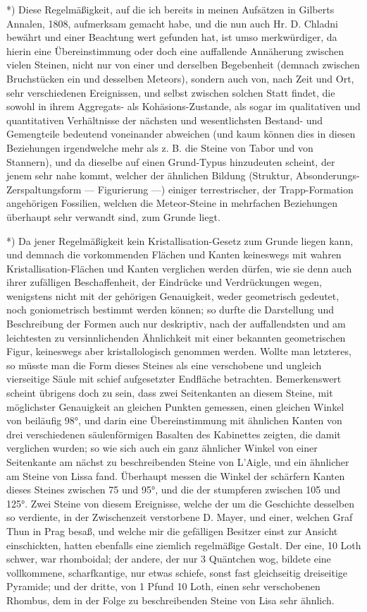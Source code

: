 \documentclass[a4paper, 11pt, oneside, german]{article}
\begin{document}
*) Diese Regelmäßigkeit, auf die ich bereits in meinen Aufsätzen in Gilberts Annalen, 1808, aufmerksam gemacht habe, und die nun auch Hr. D. Chladni bewährt und einer Beachtung wert gefunden hat, ist umso merkwürdiger, da hierin eine Übereinstimmung oder doch eine auffallende Annäherung zwischen vielen Steinen, nicht nur von einer und derselben Begebenheit (demnach zwischen Bruchstücken ein und desselben Meteors), sondern auch von, nach Zeit und Ort, sehr verschiedenen Ereignissen, und selbst zwischen solchen Statt findet, die sowohl in ihrem Aggregats- als Kohäsions-Zustande, als sogar im qualitativen und quantitativen Verhältnisse der nächsten und wesentlichsten Bestand- und Gemengteile bedeutend voneinander abweichen (und kaum können dies in diesen Beziehungen irgendwelche mehr als z. B. die Steine von Tabor und von Stannern), und da dieselbe auf einen Grund-Typus hinzudeuten scheint, der jenem sehr nahe kommt, welcher der ähnlichen Bildung (Struktur, Absonderungs-Zerspaltungsform --- Figurierung ---) einiger terrestrischer, der Trapp-Formation angehörigen Fossilien, welchen die Meteor-Steine in mehrfachen Beziehungen überhaupt sehr verwandt sind, zum Grunde liegt.

*) Da jener Regelmäßigkeit kein Kristallisation-Gesetz zum Grunde liegen kann, und demnach die vorkommenden Flächen und Kanten keineswegs mit wahren Kristallisation-Flächen und Kanten verglichen werden dürfen, wie sie denn auch ihrer zufälligen Beschaffenheit, der Eindrücke und Verdrückungen wegen, wenigstens nicht mit der gehörigen Genauigkeit, weder geometrisch gedeutet, noch goniometrisch bestimmt werden können; so durfte die Darstellung und Beschreibung der Formen auch nur deskriptiv, nach der auffallendsten und am leichtesten zu versinnlichenden Ähnlichkeit mit einer bekannten geometrischen Figur, keineswegs aber kristallologisch genommen werden. Wollte man letzteres, so müsste man die Form dieses Steines als eine verschobene und ungleich vierseitige Säule mit schief aufgesetzter Endfläche betrachten. Bemerkenswert scheint übrigens doch zu sein, dass zwei Seitenkanten an diesem Steine, mit möglichster Genauigkeit an gleichen Punkten gemessen, einen gleichen Winkel von beiläufig 98°, und darin eine Übereinstimmung mit ähnlichen Kanten von drei verschiedenen säulenförmigen Basalten des Kabinettes zeigten, die damit verglichen wurden; so wie sich auch ein ganz ähnlicher Winkel von einer Seitenkante am nächst zu beschreibenden Steine von L'Aigle, und ein ähnlicher am Steine von Lissa fand. Überhaupt messen die Winkel der schärfern Kanten dieses Steines zwischen 75 und 95°, und die der stumpferen zwischen 105 und 125°. Zwei Steine von diesem Ereignisse, welche der um die Geschichte desselben so verdiente, in der Zwischenzeit verstorbene D. Mayer, und einer, welchen Graf Thun in Prag besaß, und welche mir die gefälligen Besitzer einst zur Ansicht einschickten, hatten ebenfalls eine ziemlich regelmäßige Gestalt. Der eine, 10 Loth schwer, war rhomboidal; der andere, der nur 3 Quäntchen wog, bildete eine vollkommene, scharfkantige, nur etwas schiefe, sonst fast gleichseitig dreiseitige Pyramide; und der dritte, von 1 Pfund 10 Loth, einen sehr verschobenen Rhombus, dem in der Folge zu beschreibenden Steine von Lisa sehr ähnlich.
\end{document}
